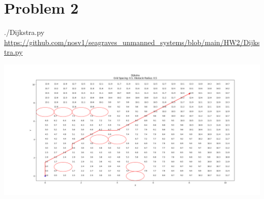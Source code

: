 \documentclass{article}
\begin{document}
        \section*{Problem 2}
        \begin{minipage}{\linewidth}
            \raggedright
            ./Dijkstra.py \break
            \url{https://github.com/nosv1/seagraves_unmanned_systems/blob/main/HW2/Dijkstra.py}
            \begin{center}
                \includegraphics[width=\linewidth]{HW2P2 Dijkstra.png}
            \end{center}
        \end{minipage}
\end{document}
